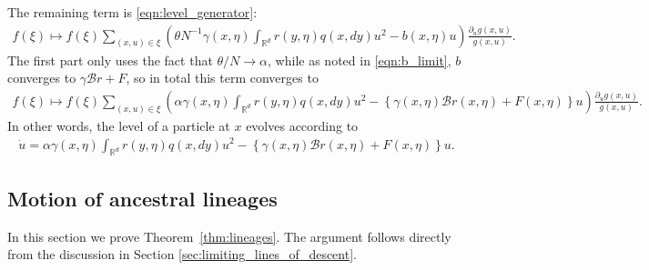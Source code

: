 \documentclass[12pt]{article}
\newcommand{\IR}{\mathbb R}
\newcommand{\DG}{\mathcal{B}}  %
\newcommand{\lp}{\xi}              %
\begin{document}
The remaining term is \eqref{eqn:level_generator}:
\begin{align*}
    f(\lp)
    \mapsto
    f(\lp)
    \sum_{(x, u) \in \lp}
    \left(
    \theta
        N^{-1} \gamma(x,\eta) \int_{\IR^d} r(y, \eta) q(x, dy) u^2
        -
        b(x, \eta)u
    \right)
    \frac{\partial_u g(x,u)}{g(x,u)} .
\end{align*}
The first part only uses the fact that $\theta/N \to \alpha$,
while as noted in \eqref{eqn:b_limit}, $b$ converges to $\gamma \DG r + F$,
so in total this term converges to
\begin{align*}
    f(\lp)
    \mapsto
    f(\lp)
    \sum_{(x, u) \in \lp}
    \left(
    \alpha
        \gamma(x,\eta) \int_{\IR^d} r(y, \eta) q(x, dy) u^2
        -
        \left\{
            \gamma(x, \eta) \DG r(x, \eta) + F(x, \eta)
        \right\} u
    \right)
    \frac{\partial_u g(x,u)}{g(x,u)} .
\end{align*}
In other words, the level of a particle at $x$ evolves according to
\begin{align*}
    \dot u
    =
    \alpha
        \gamma(x,\eta) \int_{\IR^d} r(y, \eta) q(x, dy) u^2
        -
        \left\{
            \gamma(x, \eta) \DG r(x, \eta) + F(x, \eta)
        \right\} u .
\end{align*}



\subsection{Motion of ancestral lineages}

In this section we prove Theorem~\ref{thm:lineages}.
The argument follows directly from the discussion in Section \ref{sec:limiting_lines_of_descent}.
\end{document}
